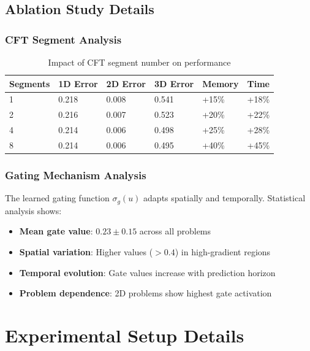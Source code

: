 \documentclass[11pt,twocolumn]{article}
\begin{document}
\subsection{Ablation Study Details}

\subsubsection{CFT Segment Analysis}

\begin{table}[h]
\centering
\caption{Impact of CFT segment number on performance}
\label{tab:segments}
\scriptsize
\begin{tabular}{@{}p{1cm}p{1cm}p{1cm}p{1cm}p{1cm}p{1cm}@{}}
\toprule
\textbf{Segments} & \textbf{1D Error} & \textbf{2D Error} & \textbf{3D Error} & \textbf{Memory} & \textbf{Time} \\
\midrule
1 & 0.218 & 0.008 & 0.541 & +15\% & +18\% \\
2 & 0.216 & 0.007 & 0.523 & +20\% & +22\% \\
4 & 0.214 & 0.006 & 0.498 & +25\% & +28\% \\
8 & 0.214 & 0.006 & 0.495 & +40\% & +45\% \\
\bottomrule
\end{tabular}
\end{table}

\subsubsection{Gating Mechanism Analysis}

The learned gating function $\sigma_g(u)$ adapts spatially and temporally. Statistical analysis shows:

\begin{itemize}
    \item \textbf{Mean gate value}: $0.23 \pm 0.15$ across all problems
    \item \textbf{Spatial variation}: Higher values ($>0.4$) in high-gradient regions
    \item \textbf{Temporal evolution}: Gate values increase with prediction horizon
    \item \textbf{Problem dependence}: 2D problems show highest gate activation
\end{itemize}

\section{Experimental Setup Details}
\label{app:setup}
\end{document}
